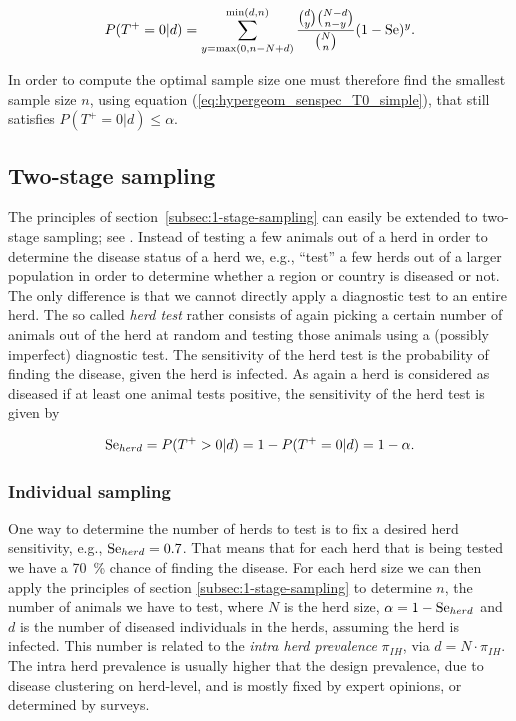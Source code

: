 \documentclass[nojss]{jss}
\begin{document}
\begin{equation}
\label{eq:hypergeom_senspec_T0_simple} 
% 
P(T^+=0|d) = \sum_{y = \max(0,n-N+d)}^{\min(d,n)} \frac{{d \choose 
y}{N-d \choose n-y}}{{N \choose n}} (1-\Se)^y. 
% 
\end{equation} 

In order to compute the optimal sample size one must therefore find 
the smallest sample size $n$, using equation 
(\ref{eq:hypergeom_senspec_T0_simple}), that still satisfies 
$P(T^+=0|d)\leq \alpha$. 


\subsection{Two-stage sampling} 
\label{subsec:2-stage-sampling}

The principles of section~\ref{subsec:1-stage-sampling} can easily 
be extended to two-stage sampling; see \cite{CaBa98B}. Instead of 
testing a few animals out of a herd in order to determine the 
disease status of a herd we, e.g., ``test'' a few herds out of a 
larger population in order to determine whether a region or country 
is diseased or not. The only difference is that we cannot directly 
apply a diagnostic test to an entire herd. The so called \emph{herd 
test} rather consists of again picking a certain number of animals 
out of the herd at random and testing those animals using a 
(possibly imperfect) diagnostic test. The sensitivity of the herd 
test is the probability of finding the disease, given the herd is 
infected. As again a herd is considered as diseased if at least one 
animal tests positive, the sensitivity of the herd test is given by 

$$\mbox{Se}_{herd} = P(T^+>0|d) = 1 - P(T^+ = 0|d) = 1 - \alpha.$$ 


\subsubsection{Individual sampling} \label{subsubsec:ind-sampling} 

One way to determine the number of herds to test is to fix a desired 
herd sensitivity, e.g., $\mbox{Se}_{herd} = 0.7$. That means that for each 
herd that is being tested we have a 70~\% chance of finding the 
disease. For each herd size we can then apply the principles of 
section \ref{subsec:1-stage-sampling} to determine $n$, the number 
of animals we have to test, where $N$ is the herd size, $\alpha = 1 
- \mbox{Se}_{herd}$ and $d$ is the number of diseased individuals in the 
herds, assuming the herd is infected. This number is related to the 
\emph{intra herd prevalence} $\pi_{IH}$, via $d = N\cdot \pi_{IH}$. 
The intra herd prevalence is usually higher that the design 
prevalence, due to disease clustering on herd-level, and is mostly 
fixed by expert opinions, or determined by surveys.  
\end{document}
